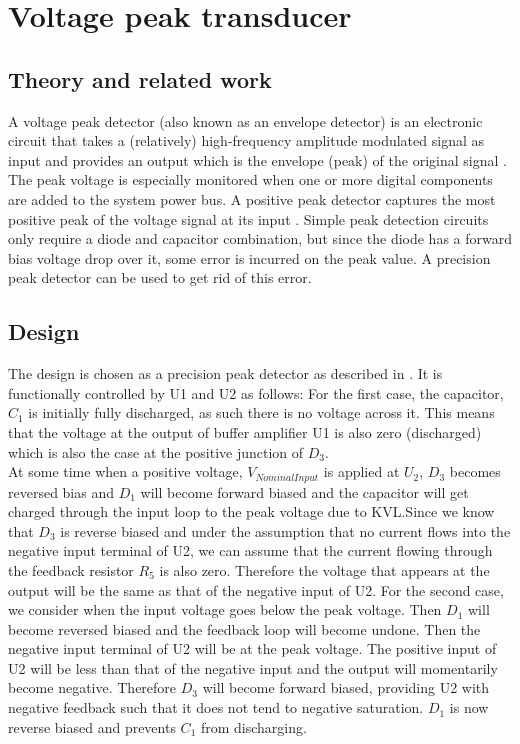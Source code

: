 \chapter{Voltage peak transducer}

\section{Theory and related work} \label{sec:Voltage_peak_detector}

A voltage peak detector (also known as an envelope detector) is an electronic circuit that takes a (relatively) high-frequency amplitude modulated signal as input and provides an output which is the envelope (peak) of the original signal \cite{VPD}. The peak voltage is especially monitored when one or more digital components are added to the system power bus. A positive peak detector captures the most positive peak of the voltage signal at its input \cite{precision_peak_detector}. Simple peak detection circuits only require a diode and capacitor combination, but since the diode has a forward bias voltage drop over it, some error is incurred on the peak value. A precision peak detector can be used to get rid of this error.

\section{Design} \label{sec:design_vpd1}
The design is chosen as a precision peak detector as described in \cite{voltage_peak_detector}. It is functionally controlled by U1 and U2 as follows: For the first case, the capacitor, $C_1$ is initially fully discharged, as such there is no voltage across it. This means that the voltage at the output of buffer amplifier U1 is also zero (discharged) which is also the case at the positive junction of $D_3$.\\At some time when a positive voltage, $V_{Nominal Input}$ is applied at $U_2$, $D_3$ becomes reversed bias and $D_1$ will become forward biased and the capacitor will get charged through the input loop to the peak voltage due to KVL.Since we know that $D_3$ is reverse biased and under the assumption that no current flows into the  negative input terminal of U2, we can assume that the current flowing through the feedback resistor $R_5$ is also zero. Therefore the voltage that appears at the output will be the same as that of the negative input of U2. For the second case, we consider when the input voltage goes below the peak voltage. Then $D_1$ will become reversed biased and the feedback loop will become undone. Then the negative input terminal of U2 will be at the peak voltage. The positive input of U2 will be less than that of the negative input and the output will momentarily become negative. Therefore $D_3$ will become forward biased, providing U2 with negative feedback such that it does not tend to negative saturation.
$D_1$ is now reverse biased and prevents $C_1$ from discharging. 

